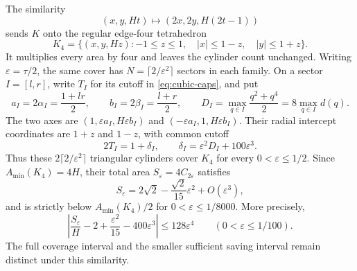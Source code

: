\begin{remark}\label{rem:angular-cubic-scale}
The similarity
\[
 (x,y,Ht)\longmapsto(2x,2y,H(2t-1))
\]
sends $K$ onto the regular edge-four tetrahedron
\[
 K_4=\{(x,y,Hz):-1\le z\le1,\quad
                  |x|\le1-z,\quad |y|\le1+z\}.
\]
It multiplies every area by four and leaves the cylinder count unchanged.
Writing $\varepsilon=\tau/2$, the same cover has
$N=\lceil2/\varepsilon^2\rceil$ sectors in each family. On a sector
$I=[l,r]$, write $T_I$ for its cutoff in \eqref{eq:cubic-caps}, and put
\[
 a_I=2\alpha_I=\frac{1+lr}{2},\qquad
 b_I=2\beta_I=\frac{l+r}{2},\qquad
 D_I=\max_{q\in I}\frac{q^2+q^4}{2}
     =8\max_{q\in I}d(q).
\]
The two axes are $(1,\varepsilon a_I,H\varepsilon b_I)$ and
$(-\varepsilon a_I,1,H\varepsilon b_I)$. Their radial intercept
coordinates are $1+z$ and $1-z$, with common cutoff
\[
 2T_I=1+\delta_I,\qquad
 \delta_I=\varepsilon^2D_I+100\varepsilon^3.
\]
Thus these $2\lceil2/\varepsilon^2\rceil$ triangular cylinders cover
$K_4$ for every $0<\varepsilon\le1/2$. Since
$A_{\min}(K_4)=4H$, their total area $S_\varepsilon=4C_{2\varepsilon}$
satisfies
\[
 S_\varepsilon
 =2\sqrt2-\frac{\sqrt2}{15}\varepsilon^2+O(\varepsilon^3),
\]
and is strictly below $A_{\min}(K_4)/2$ for
$0<\varepsilon\le1/8000$. More precisely,
\[
 \left|\frac{S_\varepsilon}{H}-2+\frac{\varepsilon^2}{15}
                         -400\varepsilon^3\right|
 \le128\varepsilon^4\qquad(0<\varepsilon\le1/100).
\]
The full coverage interval and the smaller sufficient saving interval
remain distinct under this similarity.
\end{remark}
